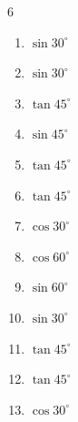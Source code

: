 \begin{multicols}{6}
\begin{enumerate}
  \item $\displaystyle \sin{30^\circ}$


  \item $\displaystyle \sin{30^\circ}$


  \item $\displaystyle \tan{45^\circ}$

        \phantom{$\displaystyle =1$}

  \item $\displaystyle \sin{45^\circ}$


\columnbreak %

  \item $\displaystyle \tan{45^\circ}$

        \phantom{$\displaystyle =1$}

  \item $\displaystyle \tan{45^\circ}$

        \phantom{$\displaystyle =1$}

  \item $\displaystyle \cos{30^\circ}$


  \item $\displaystyle \cos{60^\circ}$


  \item $\displaystyle \sin{60^\circ}$


  \item $\displaystyle \sin{30^\circ}$


  \item $\displaystyle \tan{45^\circ}$

        \phantom{$\displaystyle =1$}

  \item $\displaystyle \tan{45^\circ}$

        \phantom{$\displaystyle =1$}

  \item $\displaystyle \cos{30^\circ}$


\end{enumerate}
\end{multicols}
